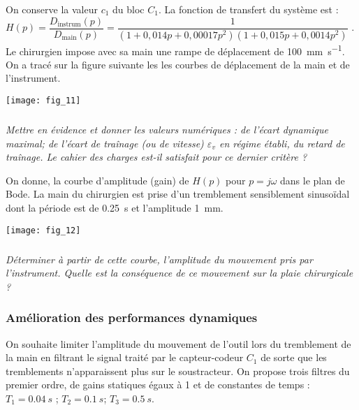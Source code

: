 \begin{multicols}{2}
On conserve la valeur $c_1$ du bloc $C_1$. La fonction de transfert du système est : $H(p)=\dfrac{D_{\text{instrum}}(p)}{D_{\text{main}}(p)}=\dfrac{1}{\left(1+0,014p+0,00017p^2 \right)\left( 1+0,015p+0,0014p^2\right)}$ .
Le chirurgien impose avec sa main une rampe de déplacement  de \SI{100}{mm.s^{-1}}. On a tracé sur la figure suivante les les courbes de déplacement de la main et de l’instrument.


\begin{center}
\texttt{[image: fig\_11]}
\end{center}


\subparagraph{}\textit{Mettre en évidence et donner les valeurs numériques :
de l’écart dynamique maximal; de l’écart de traînage (ou de vitesse) $\varepsilon_v$ en régime établi, du retard de traînage. Le cahier des charges est-il satisfait pour ce dernier critère ?
}
\ifprof
\begin{corrige}
\end{corrige}
\else
\fi


On donne, la courbe d’amplitude (gain) de $H(p)$ pour $p = j\omega$ dans le plan de Bode. 
La main du chirurgien est prise d’un tremblement sensiblement sinusoïdal dont la période est de \SI{0,25}{s} et l’amplitude \SI{1}{mm}. 


\begin{center}
\texttt{[image: fig\_12]}
\end{center}

\subparagraph{}\textit{Déterminer à partir de cette courbe, l’amplitude du mouvement pris par l’instrument. Quelle est la conséquence de ce mouvement sur la plaie chirurgicale ?}
\ifprof
\begin{corrige}
\end{corrige}
\else
\fi

\subsubsection*{Amélioration des performances dynamiques}

On souhaite limiter l’amplitude du mouvement de l’outil lors du tremblement de la main en  filtrant le signal traité par le capteur-codeur $C_1$ de sorte que les tremblements n’apparaissent plus sur le soustracteur. On propose trois filtres du premier ordre, de gains statiques égaux à 1 et de constantes de temps :	 $T_1 = \SI{0,04}{s}$ ; $T_2 = \SI{0,1}{s}$; $T_3 = \SI{0,5}{s}$.




\end{multicols}

